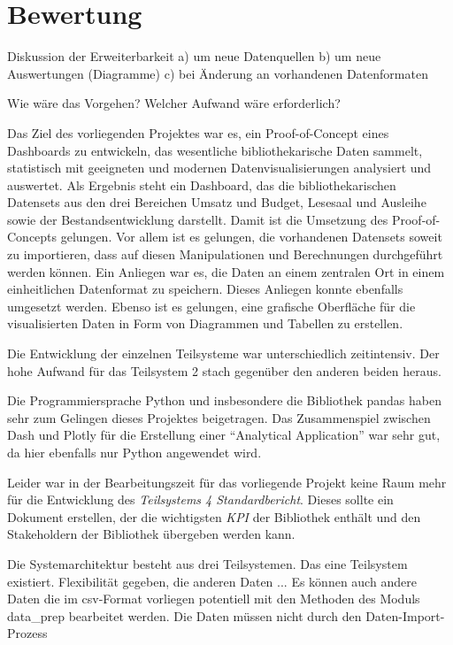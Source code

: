 \section{Bewertung}
Diskussion der Erweiterbarkeit 
a) um neue Datenquellen
b) um neue Auswertungen (Diagramme)
c) bei Änderung an vorhandenen Datenformaten

Wie wäre das Vorgehen? Welcher Aufwand wäre erforderlich?


Das Ziel des vorliegenden Projektes war es, ein Proof-of-Concept eines Dashboards zu entwickeln, 
das wesentliche bibliothekarische Daten sammelt, statistisch mit geeigneten und modernen Datenvisualisierungen analysiert und
auswertet. Als Ergebnis steht ein Dashboard, das die bibliothekarischen Datensets aus den drei Bereichen Umsatz und Budget,
Lesesaal und Ausleihe sowie der Bestandsentwicklung darstellt. Damit ist die Umsetzung des Proof-of-Concepts gelungen.
Vor allem ist es gelungen, die vorhandenen Datensets soweit zu importieren, dass auf diesen Manipulationen und Berechnungen
durchgeführt werden können. Ein Anliegen war es, die Daten an einem zentralen Ort in einem einheitlichen Datenformat zu speichern. Dieses
Anliegen konnte ebenfalls umgesetzt werden. Ebenso ist es gelungen, eine grafische Oberfläche für die visualisierten Daten in Form von Diagrammen und Tabellen zu erstellen. 

Die Entwicklung der einzelnen Teilsysteme war unterschiedlich zeitintensiv. Der hohe Aufwand für das Teilsystem 2 stach gegenüber
den anderen beiden heraus.


Die Programmiersprache Python und insbesondere die Bibliothek pandas haben sehr zum Gelingen dieses Projektes beigetragen.
Das Zusammenspiel zwischen Dash und Plotly für die Erstellung einer \enquote{Analytical Application} war sehr gut, da hier
ebenfalls nur Python angewendet wird.

Leider war in der Bearbeitungszeit für das vorliegende Projekt keine Raum mehr für die Entwicklung des \textit{Teilsystems 4 Standardbericht}.
Dieses sollte ein Dokument erstellen, der die wichtigsten \textit{\acrlong{KPI}} der Bibliothek enthält und den Stakeholdern der Bibliothek übergeben werden kann.

Die Systemarchitektur besteht aus drei Teilsystemen. Das eine Teilsystem existiert. Flexibilität gegeben, die anderen Daten ...
Es können auch andere Daten die im csv-Format vorliegen potentiell mit den Methoden des Moduls data\_prep bearbeitet werden.
Die Daten müssen nicht durch den Daten-Import-Prozess

